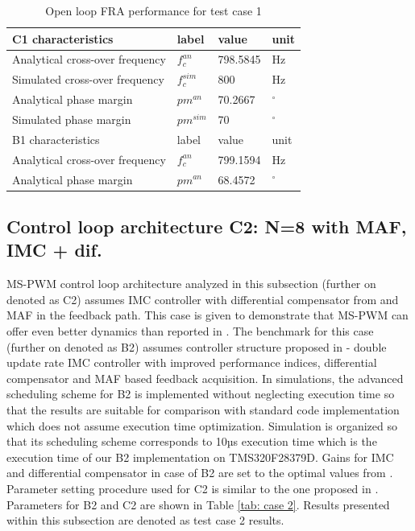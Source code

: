 \documentclass[journal]{IEEEtran}
\begin{document}
\begin{table}[h!]
			  \caption{Open loop FRA performance for test case 1}
              \label{tab:tc1_olfra}
              \centering
              \begin{tabular}{llll}
                           \midrule\midrule
        C1 characteristics & label & value   & unit\\
        \midrule               
                  Analytical cross-over frequency	& $f_{c}^{an}$ & 798.5845 &Hz\\
                  Simulated cross-over frequency	& $f_{c}^{sim}$ & 800 &Hz\\ 
                  Analytical phase margin  & $pm^{an}$ & 70.2667 &  $^\circ$   \\
                  Simulated phase margin  & $pm^{sim}$ & 70 &  $^\circ$   \\
                  \midrule\midrule
                  B1 characteristics & label  & value    & unit\\
                  \midrule
                  Analytical cross-over frequency	& $f_{c}^{an}$ & 799.1594 &Hz\\
                  Analytical phase margin  & $pm^{an}$ & 68.4572 &  $^\circ$   \\
                  \midrule\midrule
                                                        
              \end{tabular}
\end{table}

\subsection{Control loop architecture C2: N=8 with MAF, IMC + dif.}
MS-PWM control loop architecture analyzed in this subsection (further on denoted as C2) assumes IMC controller with differential compensator from \cite{vuksa2017} and MAF in the feedback path. This  case  is  given  to demonstrate  that  MS-PWM  can  offer  even  better  dynamics than  reported  in \cite{vuksa2017}. The benchmark for this case (further on denoted as B2) assumes controller structure proposed in \cite{vuksa2017} - double update rate IMC controller with improved performance indices, differential compensator and MAF based feedback acquisition. In simulations, the advanced scheduling scheme for B2 is implemented without neglecting execution time so that the results are suitable for comparison with standard code implementation which does not assume execution time optimization. Simulation is organized so that its scheduling scheme corresponds to 10µs execution time which is the execution time of our B2 implementation on TMS320F28379D. Gains for IMC and differential compensator in case of B2 are set to the optimal values from \cite{vuksa2017}. Parameter setting procedure used for C2 is similar to the one proposed in \cite{vuksa2017}. Parameters for B2 and C2 are shown in Table \ref{tab: case 2}. Results presented within this subsection are denoted as test case 2 results. 
\par
\end{document}
